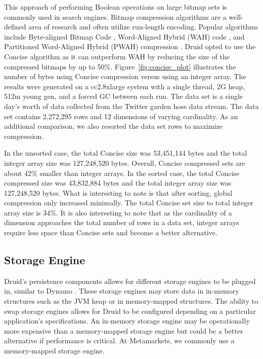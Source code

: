 \documentclass{vldb}
\begin{document}
This approach of performing Boolean operations on large bitmap sets is
commonly used in search engines. Bitmap compression algorithms are a
well-defined area of research and often utilize run-length
encoding. Popular algorithms include Byte-aligned Bitmap Code \cite{antoshenkov1995byte},
Word-Aligned Hybrid (WAH) code \cite{wu2006optimizing}, and Partitioned Word-Aligned
Hybrid (PWAH) compression \cite{van2011memory}. Druid opted to use the Concise
algorithm \cite{colantonio2010concise} as it can outperform WAH by reducing the size of the
compressed bitmaps by up to 50\%.  Figure~\ref{fig:concise_plot} illustrates the number of
bytes using Concise compression versus using an integer array. The
results were generated on a cc2.8xlarge system with a single thread,
2G heap, 512m young gen, and a forced GC between each run. The data
set is a single day’s worth of data collected from the Twitter garden
hose \cite{twitter2013} data stream. The data set contains 2,272,295 rows and 12
dimensions of varying cardinality. As an additional comparison, we
also resorted the data set rows to maximize compression.

In the unsorted case, the total Concise size was 
53,451,144 bytes and the total integer array size was 127,248,520 bytes. Overall,
Concise compressed sets are about 42\% smaller than integer arrays.
In the sorted case, the total Concise compressed size was 43,832,884
bytes and the total integer array size was 127,248,520 bytes.  What is
interesting to note is that after sorting, global compression only
increased minimally. The total Concise set size to total integer array
size is 34\%. It is also interesting to note that as the cardinality
of a dimension approaches the total number of rows in a data set,
integer arrays require less space than Concise sets and become a better alternative.

\subsection{Storage Engine}
Druid’s persistence components allows for different storage engines to
be plugged in, similar to Dynamo \cite{decandia2007dynamo}. These storage engines may store
data in in-memory structures such as the JVM heap or in memory-mapped
structures. The ability to swap storage engines allows for Druid to be
configured depending on a particular application’s specifications. An
in-memory storage engine may be operationally more expensive than a
memory-mapped storage engine but could be a better alternative if
performance is critical. At Metamarkets, we commonly use a
memory-mapped storage engine.
\end{document}
